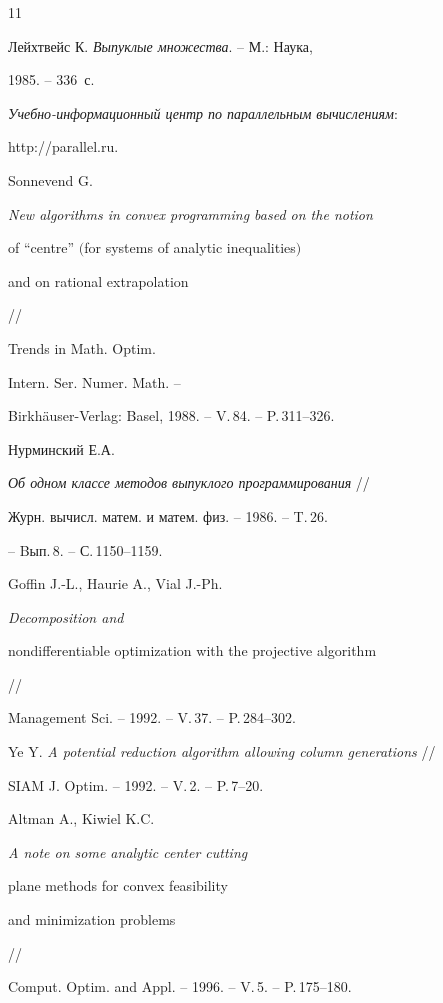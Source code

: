 \begin{thebibliography}{11}


Лейхтвейс К. {\em Выпуклые множества}. -- М.: Наука,


1985. -- 336~с.




{\em Учебно-информационный центр по параллельным вычислениям}:


http://parallel.ru.




Sonnevend G. {\em New algorithms in convex programming based on the notion


of ``centre'' $($for systems of analytic inequalities$)$


and on rational extrapolation} // 


Trends in Math. Optim. 




Intern. Ser. Numer. Math. --


Birkh\"auser-Verlag: Basel, 1988. -- V.\,84. -- P.\,311--326.




Нурминский Е.А.


{\em Об одном классе методов выпуклого программирования} //


Журн. вычисл. матем. и матем. физ. -- 1986. -- T.\,26.


-- Bып.\,8. -- С.\,1150--1159.




Goffin J.-L., Haurie A., Vial J.-Ph. {\em Decomposition and 


nondifferentiable optimization with the projective algorithm} //


Management Sci. -- 1992. -- V.\,37. -- P.\,284--302.




Ye Y. {\em A potential reduction algorithm allowing column generations} //


SIAM J. Optim. -- 1992. -- V.\,2. -- P.\,7--20.




Altman A., Kiwiel K.C. {\em A note on some analytic center cutting 


plane methods for convex feasibility


and minimization problems} //


Comput. Optim. and Appl. -- 1996. -- V.\,5. -- P.\,175--180.





\end{thebibliography}


\vskip 2cm












\label{end}





